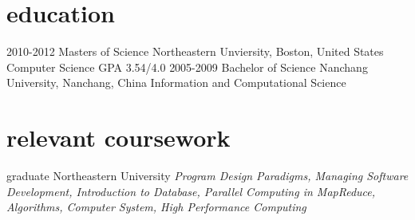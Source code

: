 \documentclass[]{ly-cv} %
\begin{document}
\section{education}
\begin{entrylist}
\entry
{2010-2012}
{Masters of Science} 
{Northeastern Unviersity, Boston, United States}
{Computer Science \hspace{4mm} \footnotesize{GPA 3.54/4.0}}
\entry
{2005-2009}
{Bachelor of Science}
{Nanchang University, Nanchang, China} 
{Information and Computational Science}
\end{entrylist}
\section{relevant coursework}

\begin{entrylist}
\entry
{graduate}
{}
{Northeastern University}
{\emph{Program Design Paradigms, Managing Software Development, Introduction to Database, Parallel Computing in MapReduce, Algorithms,
Computer System, High Performance Computing}}
\end{entrylist}
\end{document}
